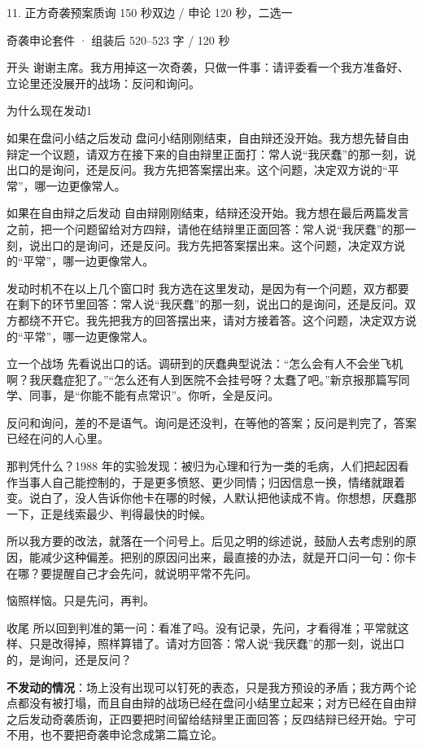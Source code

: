 \documentclass[script,pro]{debate}
\begin{document}
\begin{stage}{11. 正方奇袭预案}{质询 150 秒双边 / 申论 120 秒，二选一}
\begin{kit}{奇袭申论}{套件 · 组装后 520–523 字 / 120 秒}
\begin{fixed}{开头}
谢谢主席。我方用掉这一次奇袭，只做一件事：请评委看一个我方准备好、立论里还没展开的战场：反问和询问。
\end{fixed}
\begin{pick}{为什么现在发动}{1}
\begin{module}{如果在盘问小结之后发动}
盘问小结刚刚结束，自由辩还没开始。我方想先替自由辩定一个议题，请双方在接下来的自由辩里正面打：常人说“我厌蠢”的那一刻，说出口的是询问，还是反问。我方先把答案摆出来。这个问题，决定双方说的“平常”，哪一边更像常人。
\end{module}
\begin{module}{如果在自由辩之后发动}
自由辩刚刚结束，结辩还没开始。我方想在最后两篇发言之前，把一个问题留给对方四辩，请他在结辩里正面回答：常人说“我厌蠢”的那一刻，说出口的是询问，还是反问。我方先把答案摆出来。这个问题，决定双方说的“平常”，哪一边更像常人。
\end{module}
\begin{fallback}{发动时机不在以上几个窗口时}
我方选在这里发动，是因为有一个问题，双方都要在剩下的环节里回答：常人说“我厌蠢”的那一刻，说出口的是询问，还是反问。双方都绕不开它。我先把我方的回答摆出来，请对方接着答。这个问题，决定双方说的“平常”，哪一边更像常人。
\end{fallback}
\end{pick}
\begin{fixed}{立一个战场}
先看说出口的话。调研到的厌蠢典型说法：“怎么会有人不会坐飞机啊？我厌蠢症犯了。”“怎么还有人到医院不会挂号呀？太蠢了吧。”新京报那篇写同学、同事，是“你能不能有点常识”。你听，全是反问。

反问和询问，差的不是语气。询问是还没判，在等他的答案；反问是判完了，答案已经在问的人心里。

那判凭什么？1988 年的实验发现：被归为心理和行为一类的毛病，人们把起因看作当事人自己能控制的，于是更多愤怒、更少同情；归因信息一换，情绪就跟着变。说白了，没人告诉你他卡在哪的时候，人默认把他读成不肯。你想想，厌蠢那一下，正是线索最少、判得最快的时候。

所以我方要的改法，就落在一个问号上。后见之明的综述说，鼓励人去考虑别的原因，能减少这种偏差。把别的原因问出来，最直接的办法，就是开口问一句：你卡在哪？要提醒自己才会先问，就说明平常不先问。

恼照样恼。只是先问，再判。
\end{fixed}
\begin{fixed}{收尾}
所以回到判准的第一问：看准了吗。没有记录，先问，才看得准；平常就这样、只是改得掉，照样算错了。请对方回答：常人说“我厌蠢”的那一刻，说出口的，是询问，还是反问？
\end{fixed}
\end{kit}
\textbf{不发动的情况}：场上没有出现可以钉死的表态，只是我方预设的矛盾；我方两个论点都没有被打塌，而且自由辩的战场已经在盘问小结里立起来；对方已经在自由辩之后发动奇袭质询，正四要把时间留给结辩里正面回答；反四结辩已经开始。宁可不用，也不要把奇袭申论念成第二篇立论。
\end{stage}
\end{document}
